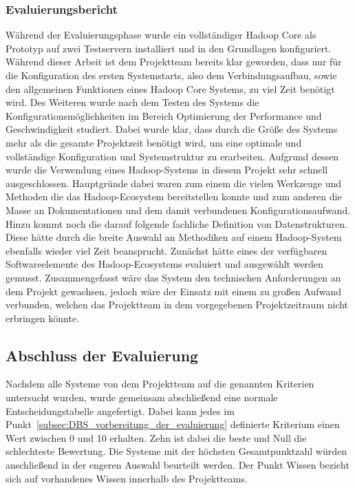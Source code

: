 \subsubsection{Evaluierungsbericht}
\label{subsubsec:hadoop_hive_impala_evaluierung}
Während der Evaluierungsphase wurde ein vollständiger Hadoop Core als Prototyp
auf zwei Testservern installiert und in den Grundlagen konfiguriert. Während
dieser Arbeit ist dem Projektteam bereits klar geworden, dass nur für die
Konfiguration des ersten Systemstarts, also dem Verbindungsaufbau, sowie den
allgemeinen Funktionen eines Hadoop Core Systems, zu viel Zeit benötigt wird.
Des Weiteren wurde nach dem Testen des Systems die Konfigurationsmöglichkeiten
im Bereich Optimierung der Performance und Geschwindigkeit studiert. Dabei
wurde klar, dass durch die Größe des Systems mehr als die gesamte Projektzeit
benötigt wird, um eine optimale und vollständige Konfiguration und
Systemstruktur zu erarbeiten. Aufgrund dessen wurde die Verwendung eines
Hadoop-Systems in diesem Projekt sehr schnell ausgeschlossen. Hauptgründe dabei
waren zum einem die vielen Werkzeuge und Methoden die das Hadoop-Ecosystem
bereitstellen konnte und zum anderen die Masse an Dokumentationen und dem damit
verbundenen Konfigurationsaufwand. Hinzu kommt noch die darauf folgende
fachliche Definition von Datenstrukturen. Diese hätte durch die breite Auswahl
an Methodiken auf einem Hadoop-System ebenfalls wieder viel Zeit beansprucht.
Zunächst hätte eines der verfügbaren Softwareelemente des Hadoop-Ecosystems
evaluiert und ausgewählt werden gemusst. Zusammengefasst wäre das System den
technischen Anforderungen an dem Projekt gewachsen, jedoch wäre der Einsatz mit
einem zu großen Aufwand verbunden, welchen das Projektteam in dem vorgegebenen
Projektzeitraum nicht erbringen könnte.
\nl%

\subsection{Abschluss der Evaluierung}
\label{subsec:abschluss_db_evaluierung}
Nachdem alle Systeme von dem Projektteam auf die genannten Kriterien untersucht
wurden, wurde gemeinsam abschließend eine normale Entscheidungstabelle
angefertigt. Dabei kann jedes im
Punkt~\ref{subsec:DBS_vorbereitung_der_evaluierung} definierte Kriterium einen
Wert zwischen 0 und 10 erhalten. Zehn ist dabei die beste und Null die
schlechteste Bewertung. Die Systeme mit der höchsten Gesamtpunktzahl würden
anschließend in der engeren Auswahl beurteilt werden. Der Punkt Wissen
bezieht sich auf vorhandenes Wissen innerhalb des Projektteams.


